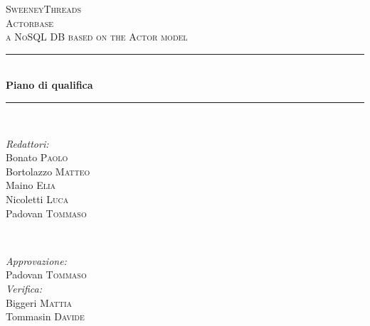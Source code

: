 \documentclass[a4paper]{report}
\begin{document}
	\begin{titlepage}
		\newcommand{\HRule}{\rule{\linewidth}{0.5mm}} 
		\center  
		
		\textsc{\LARGE SweeneyThreads}\\[1.5cm] 
		\textsc{\Large Actorbase}\\[0.5cm] 
		\textsc{\large a NoSQL DB based on the Actor model}\\[0.5cm]
		
		
		\HRule \\[0.4cm]
		{ \huge \bfseries Piano di qualifica}\\[0.4cm] 
		\HRule \\[1.5cm]
		
		\begin{minipage}{0.4\textwidth}
			\begin{flushleft} \large
				\emph{Redattori:}\\
				Bonato \textsc{Paolo} \\
				Bortolazzo \textsc{Matteo} \\
				Maino \textsc{Elia} \\
				Nicoletti \textsc{Luca} \\
				Padovan \textsc{Tommaso} \\
			\end{flushleft}
		\end{minipage}
		~
		\begin{minipage}{0.4\textwidth}
			\begin{flushright} \large
				\emph{Approvazione:} \\
				Padovan \textsc{Tommaso} \\
				\emph{Verifica:} \\
				Biggeri \textsc{Mattia} \\
				Tommasin \textsc{Davide} \\
			\end{flushright}
		\end{minipage}
		

\end{titlepage}
\end{document}
